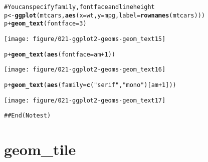 \documentclass[a4paper,titlepage]{tufte-handout}\usepackage{graphicx, color}
\makeatletter
\def\maxwidth{ %
  \ifdim\Gin@nat@width>\linewidth
    \linewidth
  \else
    \Gin@nat@width
  \fi
}
\newcommand{\hlfunctioncall}[1]{\textcolor[rgb]{0.501960784313725,0,0.329411764705882}{\textbf{#1}}}%
\newcommand{\hlstring}[1]{\textcolor[rgb]{0.6,0.6,1}{#1}}%
\newcommand{\hlcomment}[1]{\textcolor[rgb]{0.180392156862745,0.6,0.341176470588235}{#1}}%
\newenvironment{kframe}{%
 \def\at@end@of@kframe{}%
 \ifinner\ifhmode%
  \def\at@end@of@kframe{\end{minipage}}%
  \begin{minipage}{\columnwidth}%
 \fi\fi%
 \def\FrameCommand##1{\hskip\@totalleftmargin \hskip-\fboxsep
 \colorbox{shadecolor}{##1}\hskip-\fboxsep
     \hskip-\linewidth \hskip-\@totalleftmargin \hskip\columnwidth}%
 \MakeFramed {\advance\hsize-\width
   \@totalleftmargin\z@ \linewidth\hsize
   \@setminipage}}%
 {\par\unskip\endMakeFramed%
 \at@end@of@kframe}
\newenvironment{knitrout}{}{} %
\makeatother
\begin{document}
\begin{knitrout}
\begin{kframe}
\begin{alltt}
\hlcomment{# You can specify family, fontface and lineheight}
p <- \hlfunctioncall{ggplot}(mtcars, \hlfunctioncall{aes}(x=wt, y=mpg, label=\hlfunctioncall{rownames}(mtcars)))
p + \hlfunctioncall{geom_text}(fontface=3)
\end{alltt}
\end{kframe}
\texttt{[image: figure/021-ggplot2-geoms-geom\_text15]} 
\begin{kframe}\begin{alltt}
p + \hlfunctioncall{geom_text}(\hlfunctioncall{aes}(fontface=am+1))
\end{alltt}
\end{kframe}
\texttt{[image: figure/021-ggplot2-geoms-geom\_text16]} 
\begin{kframe}\begin{alltt}
p + \hlfunctioncall{geom_text}(\hlfunctioncall{aes}(family=\hlfunctioncall{c}(\hlstring{"serif"}, \hlstring{"mono"})[am+1]))
\end{alltt}
\end{kframe}
\texttt{[image: figure/021-ggplot2-geoms-geom\_text17]} 
\begin{kframe}\begin{alltt}
\hlcomment{## End(No test)}


\end{alltt}
\end{kframe}
\end{knitrout}



\section{geom\_tile}
\end{document}
